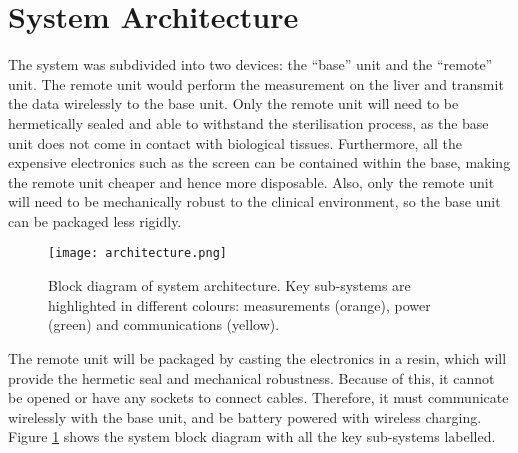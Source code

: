\section{System Architecture}

The system was subdivided into two devices: the ``base'' unit and the ``remote'' unit. The remote unit would perform the measurement on the liver and transmit the data wirelessly to the base unit. Only the remote unit will need to be hermetically sealed and able to withstand the sterilisation process, as the base unit does not come in contact with biological tissues. Furthermore, all the expensive electronics such as the screen can be contained within the base, making the remote unit cheaper and hence more disposable. Also, only the remote unit will need to be mechanically robust to the clinical environment, so the base unit can be packaged less rigidly. 



\begin{figure}[h]
	\centering
	\texttt{[image: architecture.png]}
	\caption{Block diagram of system architecture. Key sub-systems are highlighted in different colours: measurements (orange), power (green) and communications (yellow).}
	\label{fig: architecture}
\end{figure}

The remote unit will be packaged by casting the electronics in a resin, which will provide the hermetic seal and mechanical robustness. Because of this, it cannot be opened or have any sockets to connect cables. Therefore, it must communicate wirelessly with the base unit, and be battery powered with wireless charging. Figure \ref{fig: architecture} shows the system block diagram with all the key sub-systems labelled.